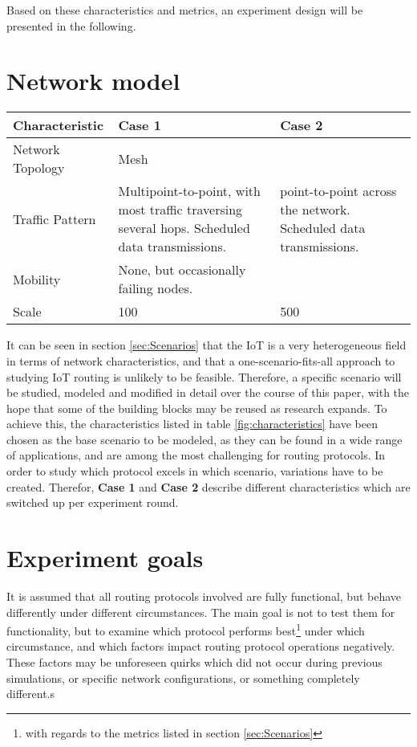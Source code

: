 \documentclass{acm_proc_article-sp}
\begin{document}
Based on these characteristics and metrics, an experiment design will be presented in the following.

\section{Network model}
\label{sec:Model}
\begin{table*}[t]
    \begin{tabularx}{\textwidth}{l | X | X  }
      Characteristic & Case 1 & Case 2 \\
      \hline
      Network Topology & Mesh & \\
      Traffic Pattern & Multipoint-to-point, with most traffic traversing several hops. Scheduled data transmissions. & point-to-point across the network. Scheduled data transmissions. \\
      Mobility & None, but occasionally failing nodes. & \\
      Scale & 100 & 500\\
    \end{tabularx}
    \caption{Characteristics of the modeled network(s)}
    \label{fig:characteristics}
\end{table*}

It can be seen in section \ref{sec:Scenarios} that the IoT is a very heterogeneous field in terms of network characteristics, and that a one-scenario-fits-all approach to studying IoT routing is unlikely to be feasible. Therefore, a specific scenario will be studied, modeled and modified in detail over the course of this paper, with the hope that some of the building blocks may be reused as research expands. To achieve this, the characteristics listed in table \ref{fig:characteristics} have been chosen as the base scenario to be modeled, as they can be found in a wide range of applications, and are among the most challenging for routing protocols.
In order to study which protocol excels in which scenario, variations have to be created. Therefor, \textbf{Case 1} and \textbf{Case 2} describe different characteristics which are switched up per experiment round.


\section{Experiment goals}
\label{sec:Goals}
It is assumed that all routing protocols involved are fully functional, but behave differently under different circumstances. The main goal is not to test them for functionality, but to examine which protocol performs best\footnote{ with regards to the metrics listed in section \ref{sec:Scenarios}} under which circumstance, and which factors impact routing protocol operations negatively. These factors may be unforeseen quirks which did not occur during previous simulations, or specific network configurations, or something completely different.s
\end{document}
